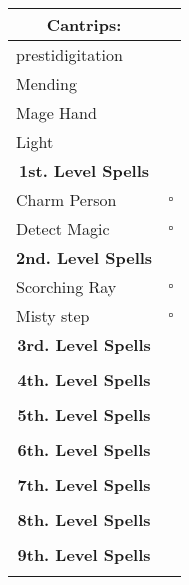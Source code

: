 \documentclass[11pt]{article}
\newcommand{\available}{$\square$}
\begin{document}
	\begin{tabularx}{\textwidth}{X|r}
\multicolumn{1}{c|}{\large \textbf{Cantrips}:} & \\
\hline
prestidigitation 								& 	\\
Mending 										& 	\\
Mage Hand		 								&	\\
Light			 								&	\\

\multicolumn{1}{c|}{\large \textbf{1st. Level Spells}} & \\
\hline
Charm Person	 								& \available \\
Detect Magic 									& \available \\

\multicolumn{1}{c|}{\large \textbf{2nd. Level Spells}} &	\\
\hline
Scorching Ray									& \available \\
Misty step										& \available \\

\multicolumn{1}{c|}{\large \textbf{3rd. Level Spells}} & \\
\hline
 												&  	\\

\multicolumn{1}{c|}{\large \textbf{4th. Level Spells}} & \\
\hline
 												&  	\\

\multicolumn{1}{c|}{\large \textbf{5th. Level Spells}} & \\
\hline
	 											&  	\\

\multicolumn{1}{c|}{\large \textbf{6th. Level Spells}} & \\
\hline
	 											&  	\\

\multicolumn{1}{c|}{\large \textbf{7th. Level Spells}} & \\
\hline
	 											&  	\\

\multicolumn{1}{c|}{\large \textbf{8th. Level Spells}} & \\
\hline
	 											&  	\\

\multicolumn{1}{c|}{\large \textbf{9th. Level Spells}} & \\
\hline
	 											&  	\\
	\end{tabularx}

\clearpage
\end{document}
